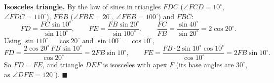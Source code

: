 \textbf{Isosceles triangle.} By the law of sines in triangles $FDC$ ($\angle FCD=10^\circ$, $\angle FDC=110^\circ$), $FEB$ ($\angle FBE=20^\circ$, $\angle FEB=100^\circ$) and $FBC$:
\[
FD=\dfrac{FC\sin10^\circ}{\sin110^\circ},\qquad FE=\dfrac{FB\sin20^\circ}{\sin100^\circ},\qquad\dfrac{FC}{FB}=\dfrac{\sin40^\circ}{\sin20^\circ}=2\cos20^\circ .
\]
Using $\sin110^\circ=\cos20^\circ$ and $\sin100^\circ=\cos10^\circ$,
\[
FD=\dfrac{2\cos20^\circ\,FB\sin10^\circ}{\cos20^\circ}=2FB\sin10^\circ,\qquad FE=\dfrac{FB\cdot2\sin10^\circ\cos10^\circ}{\cos10^\circ}=2FB\sin10^\circ .
\]
So $FD=FE$, and triangle $DEF$ is isosceles with apex $F$ (its base angles are $30^\circ$, as $\angle DFE=120^\circ$). $\blacksquare$
